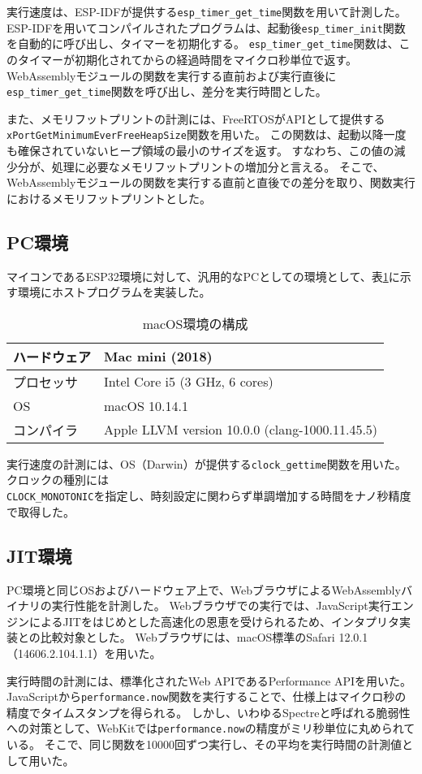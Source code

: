 実行速度は、ESP-IDFが提供する\verb|esp_timer_get_time|関数を用いて計測した。
ESP-IDFを用いてコンパイルされたプログラムは、起動後\verb|esp_timer_init|関数を自動的に呼び出し、タイマーを初期化する。
\verb|esp_timer_get_time|関数は、このタイマーが初期化されてからの経過時間をマイクロ秒単位で返す。
WebAssemblyモジュールの関数を実行する直前および実行直後に\verb|esp_timer_get_time|関数を呼び出し、差分を実行時間とした。

また、メモリフットプリントの計測には、FreeRTOSがAPIとして提供する \\
\verb|xPortGetMinimumEverFreeHeapSize|関数を用いた。
この関数は、起動以降一度も確保されていないヒープ領域の最小のサイズを返す。
すなわち、この値の減少分が、処理に必要なメモリフットプリントの増加分と言える。
そこで、WebAssemblyモジュールの関数を実行する直前と直後での差分を取り、関数実行におけるメモリフットプリントとした。

\subsection{PC環境}

マイコンであるESP32環境に対して、汎用的なPCとしての環境として、表\ref{tab:mac_spec}に示す環境にホストプログラムを実装した。

\begin{table}[htbp]
  \label{tab:mac_spec}
  \caption{macOS環境の構成}
  \begin{center}
    \begin{tabular}{|l|l|}
    \hline
    ハードウェア & Mac mini (2018) \\ \hline
    プロセッサ & Intel Core i5 (3 GHz, 6 cores) \\ \hline
    OS & macOS 10.14.1 \\ \hline
    コンパイラ & Apple LLVM version 10.0.0 (clang-1000.11.45.5) \\ \hline
    \end{tabular}
  \end{center}
\end{table}

実行速度の計測には、OS（Darwin）が提供する\verb|clock_gettime|関数を用いた。
クロックの種別には \\
\verb|CLOCK_MONOTONIC|を指定し、時刻設定に関わらず単調増加する時間をナノ秒精度で取得した。

\subsection{JIT環境}

PC環境と同じOSおよびハードウェア上で、WebブラウザによるWebAssemblyバイナリの実行性能を計測した。
Webブラウザでの実行では、JavaScript実行エンジンによるJITをはじめとした高速化の恩恵を受けられるため、インタプリタ実装との比較対象とした。
Webブラウザには、macOS標準のSafari 12.0.1（14606.2.104.1.1）を用いた。

実行時間の計測には、標準化されたWeb APIであるPerformance APIを用いた。
JavaScriptから\verb|performance.now|関数を実行することで、仕様上はマイクロ秒の精度でタイムスタンプを得られる。
しかし、いわゆるSpectreと呼ばれる脆弱性への対策として、WebKitでは\verb|performance.now|の精度がミリ秒単位に丸められている\cite{webkit_spectre}\cite{webkit_trac}。
そこで、同じ関数を10000回ずつ実行し、その平均を実行時間の計測値として用いた。
